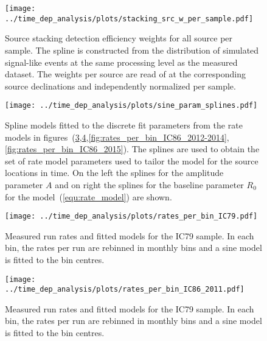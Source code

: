 \begin{figure}[H]
  \centering
  \texttt{[image: ../time\_dep\_analysis/plots/stacking\_src\_w\_per\_sample.pdf]}
  \caption[Source stacking weights for the time-dependent analysis]{
    Source stacking detection efficiency weights for all source per sample.
    The spline is constructed from the distribution of simulated signal-like events at the same processing level as the measured dataset.
    The weights per source are read of at the corresponding source declinations and independently normalized per sample.
  }
  \label{fig:tdep_stacking_src_w_per_sample}
\end{figure}

\begin{figure}[H]
  \centering
  \texttt{[image: ../time\_dep\_analysis/plots/sine\_param\_splines.pdf]}
  \caption[Parameter splines for the sine rate model per sample]{
    Spline models fitted to the discrete fit parameters from the rate models in figures~(\ref{fig:rates_per_bin_IC79},\ref{fig:rates_per_bin_IC86_2011},\ref{fig:rates_per_bin_IC86_2012-2014},\ref{fig:rates_per_bin_IC86_2015}).
    The splines are used to obtain the set of rate model parameters used to tailor the model for the source locations in time.
    On the left the splines for the amplitude parameter $A$ and on right the splines for the baseline parameter $R_0$ for the model~(\ref{equ:rate_model}) are shown.
  }
  \label{fig:tdep_sine_param_splines}
\end{figure}

\begin{figure}[H]
  \centering
  \texttt{[image: ../time\_dep\_analysis/plots/rates\_per\_bin\_IC79.pdf]}
  \caption[Rate models per bin for sample IC79]{
    Measured run rates and fitted models for the IC79 sample.
    In each bin, the rates per run are rebinned in monthly bins and a sine model is fitted to the bin centres.
  }
  \label{fig:rates_per_bin_IC79}
\end{figure}

\begin{figure}[H]
  \centering
  \texttt{[image: ../time\_dep\_analysis/plots/rates\_per\_bin\_IC86\_2011.pdf]}
  \caption[Rate models per bin for sample IC86, 2011]{
    Measured run rates and fitted models for the IC79 sample.
    In each bin, the rates per run are rebinned in monthly bins and a sine model is fitted to the bin centres.
  }
  \label{fig:rates_per_bin_IC86_2011}
\end{figure}

